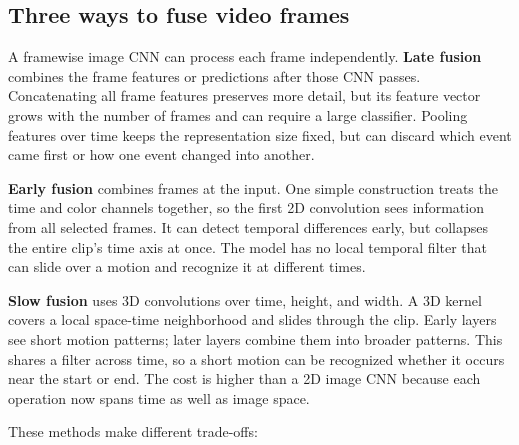 \subsection{Three ways to fuse video frames}\label{04-visual-computing-ii-ch031-three-ways-to-fuse-video-frames}

A framewise image CNN can process each frame independently. \textbf{Late fusion} combines the frame features or predictions after those CNN passes. Concatenating all frame features preserves more detail, but its feature vector grows with the number of frames and can require a large classifier. Pooling features over time keeps the representation size fixed, but can discard which event came first or how one event changed into another.

\textbf{Early fusion} combines frames at the input. One simple construction treats the time and color channels together, so the first 2D convolution sees information from all selected frames. It can detect temporal differences early, but collapses the entire clip's time axis at once. The model has no local temporal filter that can slide over a motion and recognize it at different times.

\textbf{Slow fusion} uses 3D convolutions over time, height, and width. A 3D kernel covers a local space-time neighborhood and slides through the clip. Early layers see short motion patterns; later layers combine them into broader patterns. This shares a filter across time, so a short motion can be recognized whether it occurs near the start or end. The cost is higher than a 2D image CNN because each operation now spans time as well as image space.

These methods make different trade-offs:


